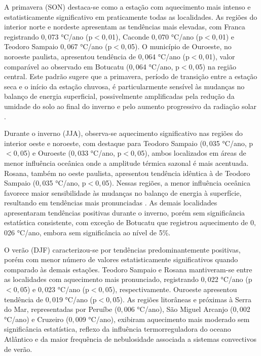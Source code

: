 A primavera (SON) destaca-se como a estação com aquecimento mais intenso e estatisticamente significativo em praticamente todas as localidades. As regiões do interior norte e nordeste apresentam as tendências mais elevadas, com Franca registrando 0${,}$073 °C/ano (p$<$0${,}$01), Caconde 0${,}$070 °C/ano (p$<$0${,}$01) e Teodoro Sampaio 0${,}$067 °C/ano (p$<$0${,}$05). O município de Ouroeste, no noroeste paulista, apresentou tendência de 0${,}$064 °C/ano (p$<$0${,}$01), valor comparável ao observado em Botucatu (0${,}$064 °C/ano, p$<$0${,}$05) na região central. Este padrão sugere que a primavera, período de transição entre a estação seca e o início da estação chuvosa, é particularmente sensível às mudanças no balanço de energia superficial, possivelmente amplificadas pela redução da umidade do solo ao final do inverno e pelo aumento progressivo da radiação solar \citep{alkama2016biophysical, shen2015dryland}.

Durante o inverno (JJA), observa-se aquecimento significativo nas regiões do interior oeste e noroeste, com destaque para Teodoro Sampaio (0${,}$035 °C/ano, p$<$0${,}$05) e Ouroeste (0${,}$033 °C/ano, p$<$0${,}$05), ambos localizados em áreas de menor influência oceânica onde a amplitude térmica sazonal é mais acentuada. Rosana, também no oeste paulista, apresentou tendência idêntica à de Teodoro Sampaio (0${,}$035 °C/ano, p$<$0${,}$05). Nessas regiões, a menor influência oceânica favorece maior sensibilidade às mudanças no balanço de energia à superfície, resultando em tendências mais pronunciadas \citep{Nobre2011}. As demais localidades apresentaram tendências positivas durante o inverno, porém sem significância estatística consistente, com exceção de Botucatu que registrou aquecimento de 0${,}$026 °C/ano, embora sem significância ao nível de 5\%.

O verão (DJF) caracterizou-se por tendências predominantemente positivas, porém com menor número de valores estatisticamente significativos quando comparado às demais estações. Teodoro Sampaio e Rosana mantiveram-se entre as localidades com aquecimento mais pronunciado, registrando 0${,}$022 °C/ano (p$<$0${,}$05) e 0${,}$023 °C/ano (p$<$0${,}$05), respectivamente. Ouroeste apresentou tendência de 0${,}$019 °C/ano (p$<$0${,}$05). As regiões litorâneas e próximas à Serra do Mar, representadas por Peruíbe (0${,}$006 °C/ano), São Miguel Arcanjo (0${,}$002 °C/ano) e Cruzeiro (0${,}$009 °C/ano), exibiram aquecimento mais moderado sem significância estatística, reflexo da influência termorreguladora do oceano Atlântico e da maior frequência de nebulosidade associada a sistemas convectivos de verão.

